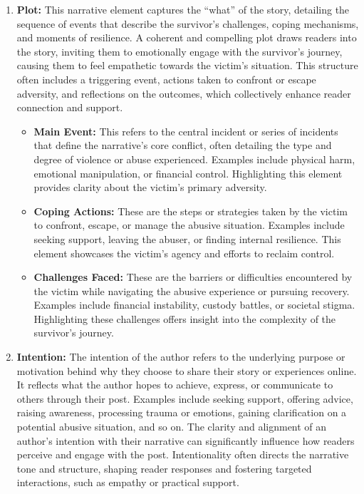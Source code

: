 \documentclass[11pt]{article}
\begin{document}
\begin{enumerate}
    \item \textbf{Plot: } 
    This narrative element captures the ``what'' of the story, detailing the sequence of events that describe the survivor's challenges, coping mechanisms, and moments of resilience. 
    A coherent and compelling plot draws readers into the story, inviting them to emotionally engage with the survivor's journey, causing them to feel empathetic towards the victim's situation. 
    This structure often includes a triggering event, actions taken to confront or escape adversity, and reflections on the outcomes, which collectively enhance reader connection and support.
    \begin{itemize}
        \item \textbf{Main Event:} This refers to the central incident or series of incidents that define the narrative's core conflict, often detailing the type and degree of violence or abuse experienced. Examples include physical harm, emotional manipulation, or financial control. Highlighting this element provides clarity about the victim's primary adversity.
        \item \textbf{Coping Actions:} These are the steps or strategies taken by the victim to confront, escape, or manage the abusive situation. Examples include seeking support, leaving the abuser, or finding internal resilience. This element showcases the victim's agency and efforts to reclaim control.
        \item \textbf{Challenges Faced:} These are the barriers or difficulties encountered by the victim while navigating the abusive experience or pursuing recovery. Examples include financial instability, custody battles, or societal stigma. Highlighting these challenges offers insight into the complexity of the survivor’s journey.
    \end{itemize}
    \item \textbf{Intention: } 
    The intention of the author refers to the underlying purpose or motivation behind why they choose to share their story or experiences online. 
    It reflects what the author hopes to achieve, express, or communicate to others through their post. 
    Examples include seeking support, offering advice, raising awareness, processing trauma or emotions, gaining clarification on a potential abusive situation, and so on. 
    The clarity and alignment of an author's intention with their narrative can significantly influence how readers perceive and engage with the post. Intentionality often directs the narrative tone and structure, shaping reader responses and fostering targeted interactions, such as empathy or practical support.
\end{enumerate}
\end{document}
